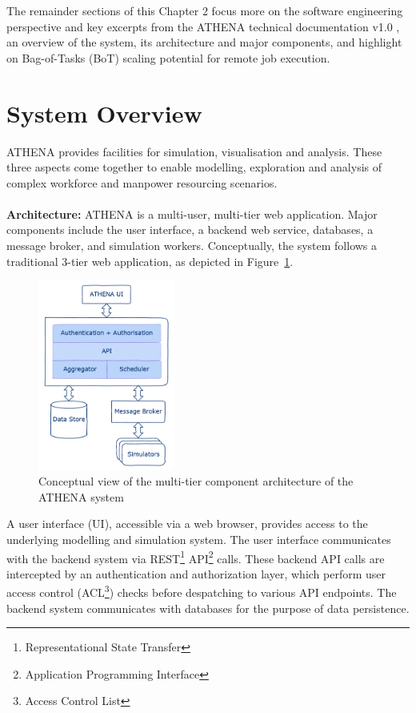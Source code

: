 The remainder sections of this Chapter 2 focus more on the software engineering perspective and key excerpts from the ATHENA technical documentation v1.0 \parencite{athenaAllDoc}, an overview of the system, its architecture and major components, and highlight on Bag-of-Tasks (BoT) scaling potential for remote job execution.

\section{System Overview}

ATHENA provides facilities for simulation, visualisation and analysis. These three aspects come together to enable modelling, exploration and analysis of complex workforce and manpower resourcing scenarios.
\\
\\
\textbf{Architecture:} \quad ATHENA is a multi-user, multi-tier web application. Major components include the user interface, a backend web service, databases, a message broker, and simulation workers. Conceptually, the system follows a traditional 3-tier web application, as depicted in Figure~\ref{fig:conceptArch}. 

\begin{figure}[!htb]
\centering
\includegraphics[width=0.4\textwidth]{Figures/ATHENA_conceptual_architecture}
\decoRule
\caption[ATHENA Conceptual Architecture]{Conceptual view of the multi-tier component architecture of the ATHENA system}
\label{fig:conceptArch}
\end{figure}

A user interface (UI), accessible via a web browser, provides access to the underlying modelling and simulation system. The user interface communicates with the backend system via REST\footnote{Representational State Transfer} API\footnote{Application Programming Interface} calls. These backend API calls are intercepted by an authentication and authorization layer, which perform user access control (ACL\footnote{Access Control List}) checks before despatching to various API endpoints. The backend system communicates with databases for the purpose of data persistence.


